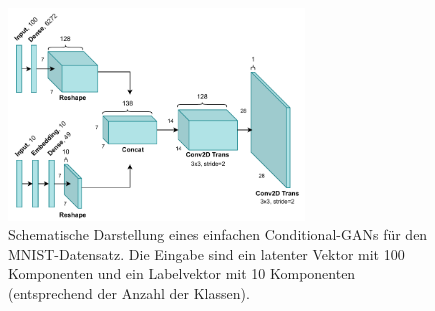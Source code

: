 \begin{figure}
    \centering
    \includegraphics[width=0.7\textwidth]{images/cgan.pdf}
    \caption{Schematische Darstellung eines einfachen Conditional-GANs für den MNIST-Datensatz. Die Eingabe sind ein latenter Vektor mit 100 Komponenten und ein Labelvektor mit 10 Komponenten (entsprechend der Anzahl der Klassen).}
    \label{fig:cgan}
\end{figure}